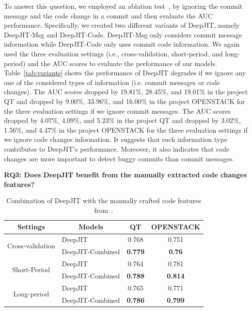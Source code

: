 
To answer this question, we employed an ablation test~\cite{korbar2017deep, liu2017deep}, by ignoring the commit message and the code change in a commit and then evaluate the AUC performance. Specifically, we created two different variants of DeepJIT, namely DeepJIT-Msg and DeepJIT-Code. DeepJIT-Msg only considers commit message information while DeepJIT-Code only uses commit code information. We again used the three evaluation settings (i.e., cross-validation, short-period, and long-period) and the AUC scores to evaluate the performance of our models. Table~\ref{tab:variants} shows the performance of DeepJIT degrades if we ignore any one of the considered types of information (i.e. commit messages or code changes). The AUC scores dropped by 19.81\%, 28.45\%, and 19.01\% in the project QT and dropped by 9.00\%, 33.96\%, and 16.00\% in the project OPENSTACK for the three evaluation settings if we ignore commit messages. The AUC scores dropped by 4.07\%, 4.09\%, and 5.23\% in the project QT and dropped by 3.02\%, 1.56\%, and 4.47\% in the project OPENSTACK for the three evaluation settings if we ignore code changes information. It suggests that each information type contributes to DeepJIT's performance. Moreover, it also indicates that code changes are more important to detect buggy commits than commit messages. 

\noindent \textbf{RQ3: Does DeepJIT benefit from the manually extracted code changes features?}

\begin{table}[ht]
  \centering
  \caption{Combination of DeepJIT with the manually crafted code features from~\cite{mcintosh2018fix}.}
    \begin{tabular}{|c|l|c|c|}
    \hline
    \textbf{Settings} & \multicolumn{1}{c|}{\textbf{Models}} & QT & OPENSTACK \\
    \hline
    \hline
    \multirow{2}[4]{*}{Cross-validation} & DeepJIT & 0.768 & 0.751 \\
\cline{2-4}          & DeepJIT-Combined & \textbf{0.779} & \textbf{0.76} \\
    \hline
    \multirow{2}[4]{*}{Short-Period} & DeepJIT & 0.764 & 0.781 \\
\cline{2-4}          & DeepJIT-Combined & \textbf{0.788} & \textbf{0.814} \\
    \hline
    \multirow{2}[4]{*}{Long-period} & DeepJIT & 0.765 & 0.771 \\
\cline{2-4}          & DeepJIT-Combined & \textbf{0.786} & \textbf{0.799} \\
    \hline
    \end{tabular}%
  \label{tab:combined}%
\end{table}%

